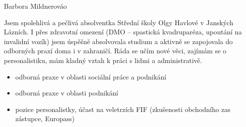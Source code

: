 \documentclass{article}
\begin{document}
\begin{cv}[avatar]{Barbora Mildnerová}{\color{white}o}



Jsem spolehlivá a pečlivá absolventka Střední školy Olgy Havlové v Janských Lázních.
I přes zdravotní omezení (DMO -- spastická kvadruparéza, upoutání na invalidní vozík) jsem úspěšně absolvovala studium a aktivně se zapojovala do odborných praxí doma i v zahraničí.
Ráda se učím nové věci, zajímám se o personalistiku, mám kladný vztah k práci s lidmi a administrativě.




\begin{cvevent}
    \begin{itemize}
        \item odborná praxe v oblasti sociální práce a podnikání
    \end{itemize}
    \begin{itemize}
        \item odborná praxe v oblasti podnikání
    \end{itemize}
    \begin{itemize}
        \item pozice personalistky, účast na veletrzích FIF (zkušenosti obchodního zas zástupce, Europass)
    \end{itemize}
\end{cvevent}



\begin{cvevent}
\end{cvevent}


\cvsidebar %




\end{cv}
\end{document}
